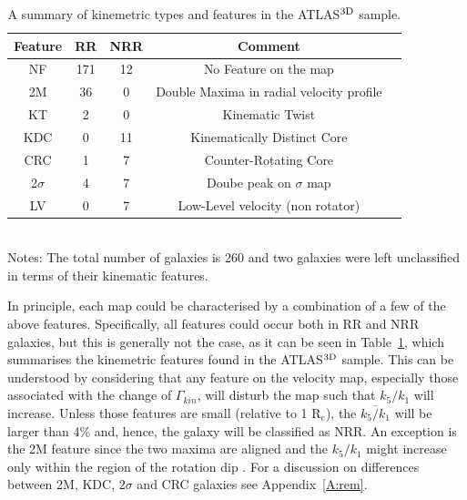 \documentclass[usenatbib,usegraphicx]{mn2e}
\begin{document}
\begin{table}
\caption{A summary of kinemetric types and features in the ATLAS$^{\rm 3D}$ sample. }
\label{t:class}%
\begin{tabular}{ccccl}
\hline
Feature & RR & NRR & Comment\\
\hline
NF                  &171 &  12 & No Feature on the map\\
2M                  & 36  & 0    & Double Maxima in radial velocity profile\\
KT                   & 2    &  0  &  Kinematic Twist\\
KDC               & 0    &  11&  Kinematically Distinct Core\\
CRC               & 1   & 7   &   Counter-Rotating Core\\
2$\sigma$     &4    &  7  &   Doube peak on $\sigma$ map\\
LV                   &0    &  7  &   Low-Level velocity (non rotator)\\
\hline
\end{tabular}
\\
Notes: The total number of galaxies is 260 and two galaxies were left unclassified in terms of their kinematic features. 
 
\end{table}

In principle, each map could be characterised by a combination of a few of the above features.  Specifically, all features could occur both in RR and NRR galaxies, but this is generally not the case, as it can be seen in Table~\ref{t:class}, which summarises the kinemetric features found in the ATLAS$^{\rm 3D}$ sample. This can be understood by considering that any feature on the velocity map, especially those associated with the change of $\Gamma_{kin}$, will disturb the map such that $k_5/k_1$ will increase. Unless those features are small (relative to 1 R$_e$), the $\overline{k_5/k_1}$ will be larger than 4\% and, hence, the galaxy will be classified as NRR. An exception is the 2M feature since the two maxima are aligned and the $k_5/k_1$ might increase only within the region of the rotation dip \citep[see][for examples of the model velocity maps and their analysis]{2006MNRAS.366..787K}. For a discussion on differences between 2M, KDC, $2\sigma$ and CRC galaxies see Appendix~\ref{A:rem}.
\end{document}
